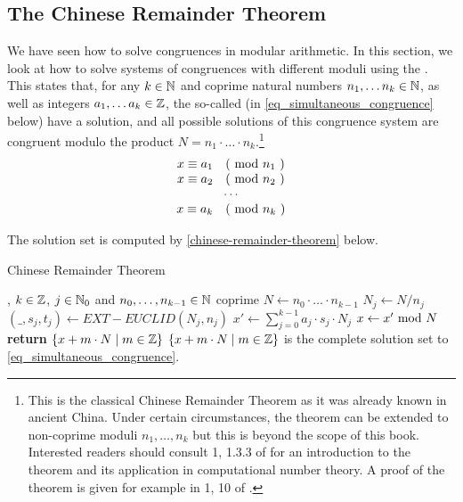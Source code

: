 \subsection{The Chinese Remainder Theorem} We have seen how to solve congruences in modular arithmetic. In this section, we look at how to solve systems of congruences with different moduli using the . This states that, for any $ k \in \mathbb{N} $ and coprime natural numbers $ n_1, \ldots n_k \in \mathbb{N} $, as well as integers $ a_1, \ldots a_k \in \mathbb{Z} $, the so-called  (in \ref{eq_simultaneous_congruence}
 below) have a solution, and all possible solutions of this congruence system are congruent modulo
the product $N= n_1 \cdot \ldots \cdot n_k $.\footnote{This is the classical Chinese Remainder Theorem as it was already known in ancient China. Under certain circumstances, the theorem can be extended to non-coprime moduli $ n_1, \ldots, n_k $ but this is beyond the scope of this book. Interested readers should consult \chaptname{} 1, \secname{} 1.3.3 of \cite{cohen-2010} for an introduction to the theorem and its application in computational number theory. A proof of the theorem is given for example in \chaptname{} 1, \secname{} 10 of \cite{mignotte-1992}.} 
\begin{equation}
\label{eq_simultaneous_congruence}
\begin{array}{c}
x \equiv a_1 \quad \text{( mod } n_1 \text{ )} \\
x \equiv a_2 \quad \text{( mod } n_2 \text{ )} \\
\cdots \\
x \equiv a_k \quad \text{( mod } n_k \text{ )} \\
\end{array}
\end{equation}

The solution set is computed by \algname{} \ref{chinese-remainder-theorem} below. 
\begin{algorithm}\caption{Chinese Remainder Theorem}
\label{chinese-remainder-theorem}
\begin{algorithmic}[0]
\Require , $k\in \mathbb{Z}$, $j\in \mathbb{N}_0$ and $n_0,\ldots,n_{k-1} \in \mathbb{N}$ coprime
\State $N\gets n_0\cdot \ldots \cdot n_{k-1}$
\State $N_j\gets N/n_j$
\State $(\_,s_j,t_j)\gets EXT-EUCLID (N_j,n_j)$
\EndWhile
\State $x'\gets \sum_{j=0}^{k-1}a_j\cdot s_j\cdot N_j$
\State $x\gets x' \text{ mod } N$
\State \textbf{return} $\{x+ m\cdot N\;|\; m\in \mathbb{Z}\}$
\EndProcedure
\Ensure $\{x+ m\cdot N\;|\; m\in \mathbb{Z}\}$ is the complete solution set to \ref{eq_simultaneous_congruence}.
\end{algorithmic}
\end{algorithm}


